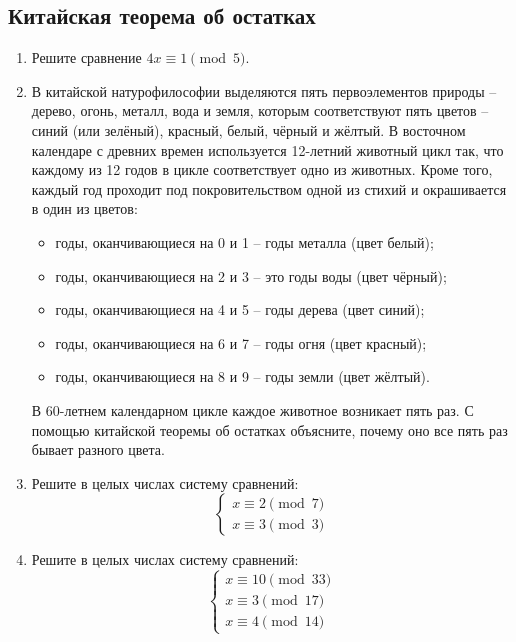 \documentclass[11pt]{article}
\begin{document}
    \subsection*{Китайская теорема об остатках}
    \begin{enumerate}[start=45,label={\bfseries \arabic*.}]
        \item Решите сравнение $4x \equiv 1 \pmod{5}$.

        \item В китайской натурофилософии выделяются пять первоэлементов природы – дерево, огонь, металл, вода и земля, которым соответствуют пять цветов – синий (или зелёный), красный, белый, чёрный и жёлтый. В восточном календаре с древних времен используется 12-летний животный цикл так, что каждому из 12 годов в цикле соответствует одно из животных. Кроме того, каждый год проходит под покровительством одной из стихий и окрашивается в один из цветов:
        \begin{itemize}
            \item годы, оканчивающиеся на 0 и 1 – годы металла (цвет белый);

            \item годы, оканчивающиеся на 2 и 3 – это годы воды (цвет чёрный);

            \item годы, оканчивающиеся на 4 и 5 – годы дерева (цвет синий);

            \item годы, оканчивающиеся на 6 и 7 – годы огня (цвет красный);

            \item годы, оканчивающиеся на 8 и 9 – годы земли (цвет жёлтый).
        \end{itemize}

        В 60-летнем календарном цикле каждое животное возникает пять раз. С помощью китайской теоремы об остатках объясните, почему оно все пять раз бывает разного цвета.

        \item Решите в целых числах систему сравнений:
              \[ \begin{cases} x \equiv 2 \pmod{7} \\  x \equiv 3 \pmod{3} \end{cases}\]

        \item Решите в целых числах систему сравнений:
              \[  \begin{cases} x \equiv 10 \pmod{33} \\ x \equiv 3 \pmod{17} \\ x \equiv 4 \pmod{14}\end{cases}\]
    \end{enumerate}
\end{document}
